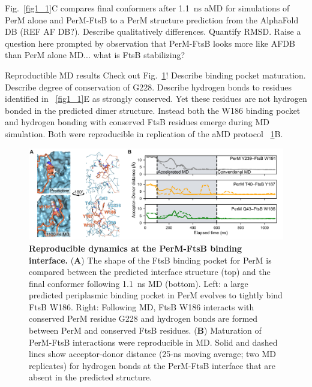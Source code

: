 \documentclass[pdflatex,sn-basic]{sn-jnl}%
\begin{document}

Fig.~\ref{fig1_1}C compares final conformers after 1.1~ns aMD for simulations of PerM alone and PerM-FtsB to a PerM structure prediction from the AlphaFold DB (REF AF DB?).
Describe qualitatively differences.
Quantify RMSD.
Raise a question here prompted by observation that PerM-FtsB looks more like AFDB than PerM alone MD... what is FtsB stabilizing?

Reproductible MD results Check out Fig.~\ref{fig1_2}!
Describe binding pocket maturation.
Describe degree of conservation of G228.
Describe hydrogen bonds to residues identified in ~\ref{fig1_1}E as strongly conserved.
Yet these residues are not hydrogen bonded in the predicted dimer structure.
Instead both the W186 binding pocket and hydrogen bonding with conserved FtsB residues emerge during MD simulation. Both were reproducible in replication of the aMD protocol ~\ref{fig1_2}B.

\begin{figure}[h]
\centering
\includegraphics[width=1.0\textwidth]{../figures/fig1_2.png}
\caption{\textbf{Reproducible dynamics at the PerM-FtsB binding interface.} (\textbf{A}) The shape of the FtsB binding pocket for PerM is compared between the predicted interface structure (top) and the final conformer following 1.1~ns MD (bottom). Left: a large predicted periplasmic binding pocket in PerM evolves to tightly bind FtsB W186. Right: Following MD, FtsB W186 interacts with conserved PerM residue G228 and hydrogen bonds are formed between PerM and conserved FtsB residues. (\textbf{B}) Maturation of PerM-FtsB interactions were reproducible in MD. Solid and dashed lines show acceptor-donor distance (25-ns moving average; two MD replicates) for hydrogen bonds at the PerM-FtsB interface that are absent in the predicted structure.}\label{fig1_2}
\end{figure}
\end{document}
